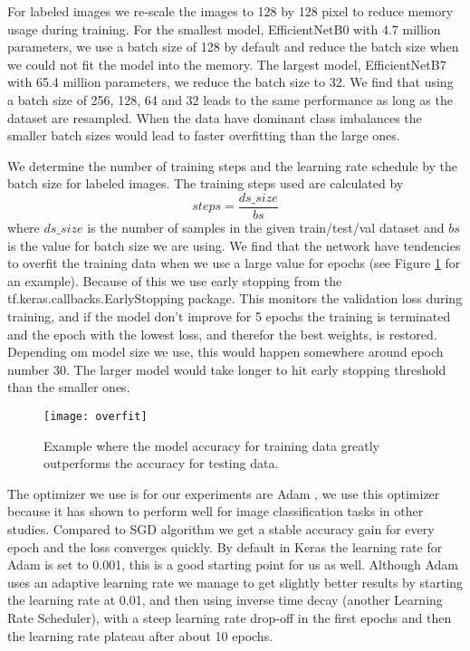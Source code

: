 \documentclass[thesis.tex]{subfiles}
\begin{document}
For labeled images we re-scale the images to 128 by 128 pixel to reduce memory usage during training. For the smallest model, EfficientNetB0 with 4.7 million parameters, we use a batch size of 128 by default and reduce the batch size when we could not fit the model into the memory. The largest model, EfficientNetB7 with 65.4 million parameters, we reduce the batch size to 32. We find that using a batch size of 256, 128, 64 and 32 leads to the same performance as long as the dataset are resampled. When the data have dominant class imbalances the smaller batch sizes would lead to faster overfitting than the large ones.

We determine the number of training steps and the learning rate schedule by the batch size for labeled images. The training steps used are calculated by $$ steps = \frac{ds\_size}{bs} $$ where $ds\_size$ is the number of samples in the given train/test/val dataset and $bs$ is the value for batch size we are using. We find that the network have tendencies to overfit the training data when we use a large value for epochs (see Figure \ref{fig:overfit} for an example). Because of this we use early stopping from the tf.keras.callbacks.EarlyStopping package. This  monitors the validation loss during training, and if the model don't improve for 5 epochs the training is terminated and the epoch with the lowest loss, and therefor the best weights, is restored. Depending om model size we use, this would happen somewhere around epoch number 30. The larger model would take longer to hit early stopping threshold than the smaller ones.

\begin{figure} %
  \begin{center}
    \texttt{[image: overfit]}
    \caption[Example where the model accuracy for training data greatly outperforms the accuracy for testing data]{Example where the model accuracy for training data greatly outperforms the accuracy for testing data.}
    \label{fig:overfit}
  \end{center}
\end{figure}

The optimizer we use is for our experiments are Adam \cite{AdamMethod17}, we use this optimizer because it has shown to perform well for image classification tasks in other studies. Compared to SGD algorithm we get a stable accuracy gain for every epoch and the loss converges quickly. By default in Keras the learning rate for Adam is set to 0.001, this is a good starting point for us as well. Although Adam uses an adaptive learning rate we manage to get slightly better results by starting the learning rate at 0.01, and then using inverse time decay (another Learning Rate Scheduler), with a steep learning rate drop-off in the first epochs and then the learning rate plateau after about 10 epochs.
\end{document}
